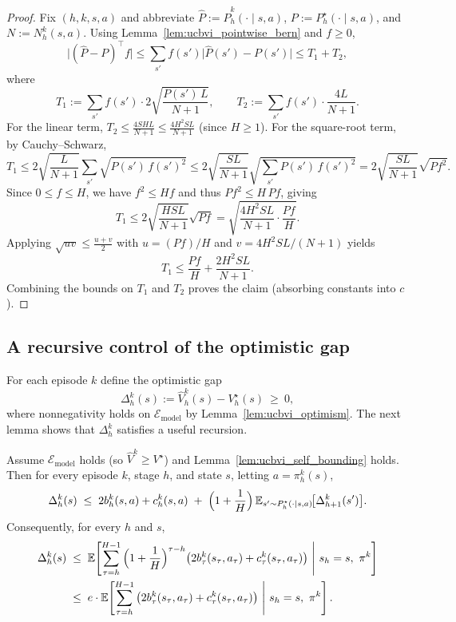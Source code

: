 \begin{proof}
Fix $(h,k,s,a)$ and abbreviate $\widehat P:=\widehat P_h^k(\cdot\mid s,a)$,
$P:=P_h^\star(\cdot\mid s,a)$, and $N:=N_h^k(s,a)$.
Using Lemma~\ref{lem:ucbvi_pointwise_bern} and $f\ge 0$,
\[
\big|(\widehat P-P)^\top f\big|
\le \sum_{s'} f(s')\big|\widehat P(s')-P(s')\big|
\le T_1 + T_2,
\]
where
\[
T_1 := \sum_{s'} f(s')\cdot 2\sqrt{\frac{P(s')\,L}{N+1}},
\qquad
T_2 := \sum_{s'} f(s')\cdot \frac{4L}{N+1}.
\]
For the linear term, $T_2\le \frac{4SHL}{N+1}\le \frac{4H^2SL}{N+1}$ (since $H\ge 1$).
For the square-root term, by Cauchy--Schwarz,
\[
T_1
\le
2\sqrt{\frac{L}{N+1}}\sum_{s'}\sqrt{P(s')\,f(s')^2}
\le
2\sqrt{\frac{SL}{N+1}}\sqrt{\sum_{s'}P(s')\,f(s')^2}
=
2\sqrt{\frac{SL}{N+1}}\sqrt{P f^2}.
\]
Since $0\le f\le H$, we have $f^2\le H f$ and thus $Pf^2\le H\,Pf$, giving
\[
T_1 \le 2\sqrt{\frac{HSL}{N+1}}\sqrt{Pf}
= \sqrt{\frac{4H^2SL}{N+1}\cdot \frac{Pf}{H}}.
\]
Applying $\sqrt{uv}\le \tfrac{u+v}{2}$ with $u=(Pf)/H$ and $v=4H^2SL/(N+1)$ yields
\[
T_1 \le \frac{Pf}{H} + \frac{2H^2SL}{N+1}.
\]
Combining the bounds on $T_1$ and $T_2$ proves the claim (absorbing constants into $c$).
\end{proof}

\subsection{A recursive control of the optimistic gap}

For each episode $k$ define the optimistic gap
\[
\Delta_h^k(s) := \widehat V_h^k(s)-V_h^\star(s)\ \ge\ 0,
\]
where nonnegativity holds on $\mathcal{E}_{\mathrm{model}}$ by Lemma~\ref{lem:ucbvi_optimism}.
The next lemma shows that $\Delta_h^k$ satisfies a useful recursion.

\begin{lemma}
\label{lem:ucbvi_gap_recursion}
Assume $\mathcal{E}_{\mathrm{model}}$ holds (so $\widehat V^k\ge V^\star$) and
Lemma~\ref{lem:ucbvi_self_bounding} holds.
Then for every episode $k$, stage $h$, and state $s$, letting $a=\pi_h^k(s)$,
\[
\Delta_h^k(s)
\;\le\;
2b_h^k(s,a) + c_h^k(s,a)
\;+\;
\Big(1+\frac{1}{H}\Big)\,
\mathbb{E}_{s'\sim P_h^\star(\cdot\mid s,a)}\!\big[\Delta_{h+1}^k(s')\big].
\]
Consequently, for every $h$ and $s$,
\begin{align*}
\Delta_h^k(s)
\; & \le\;
\E\!\left[\sum_{\tau=h}^{H-1}\Big(1+\frac{1}{H}\Big)^{\tau-h}\big(2b_\tau^k(s_\tau,a_\tau)+c_\tau^k(s_\tau,a_\tau)\big)
\ \middle|\ s_h=s,\ \pi^k\right]\\
\; & \le\;
e\cdot
\E\!\left[\sum_{\tau=h}^{H-1}\big(2b_\tau^k(s_\tau,a_\tau)+c_\tau^k(s_\tau,a_\tau)\big)\ \middle|\ s_h=s,\ \pi^k\right].
\end{align*}
\end{lemma}

